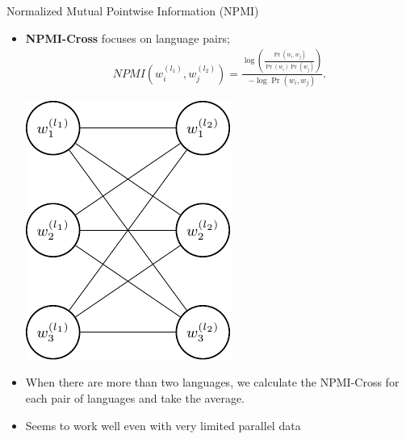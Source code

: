 \documentclass[compress]{beamer}
\begin{document}
		\begin{frame}{Normalized Mutual Pointwise Information (NPMI)}
			\begin{itemize}
				\item \textbf{NPMI-Cross} focuses on language pairs;
				\begin{align}
				NPMI\left(w_i^{(l_1)},w_j^{(l_2)}\right)=\frac{\log\left(\frac{\Pr(w_i,w_j)}{\Pr(w_i)\Pr(w_j)}\right)}{-\log\Pr(w_i,w_j)}.
				\end{align}
			\begin{center}
				\includegraphics[height=0.3\textheight]{multilingual_itm/npmi-cross.pdf}
			\end{center}

				\item When there are more than two languages, we calculate the NPMI-Cross for each pair of languages and take the average.
				\item Seems to work well even with
                                  very limited parallel data
			\end{itemize}
		\end{frame}
\end{document}
